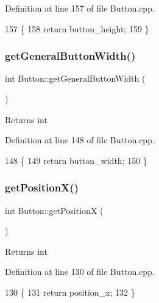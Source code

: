Definition at line 157 of file Button.\+cpp.


\begin{DoxyCode}
157                                    \{
158     \textcolor{keywordflow}{return} button\_height;
159 \}
\end{DoxyCode}
\mbox{\label{class_button_ac30c0f7242a6514c3b8a0d8b5c1135e6}} 
\subsubsection{\texorpdfstring{get\+General\+Button\+Width()}{getGeneralButtonWidth()}}
{\footnotesize\ttfamily int Button\+::get\+General\+Button\+Width (\begin{DoxyParamCaption}{ }\end{DoxyParamCaption})}

\begin{DoxyReturn}{Returns}
int 
\end{DoxyReturn}


Definition at line 148 of file Button.\+cpp.


\begin{DoxyCode}
148                                   \{
149     \textcolor{keywordflow}{return} button\_width;
150 \}
\end{DoxyCode}
\mbox{\label{class_button_a9bcc23f4a459821144cb0ffdc7c6e338}} 
\subsubsection{\texorpdfstring{get\+Position\+X()}{getPositionX()}}
{\footnotesize\ttfamily int Button\+::get\+PositionX (\begin{DoxyParamCaption}{ }\end{DoxyParamCaption})}

\begin{DoxyReturn}{Returns}
int 
\end{DoxyReturn}


Definition at line 130 of file Button.\+cpp.


\begin{DoxyCode}
130                          \{
131     \textcolor{keywordflow}{return} position\_x;
132 \}
\end{DoxyCode}
\mbox{\label{class_button_a73237a0eeb7ae52d3f5d1c16eb794775}} 
